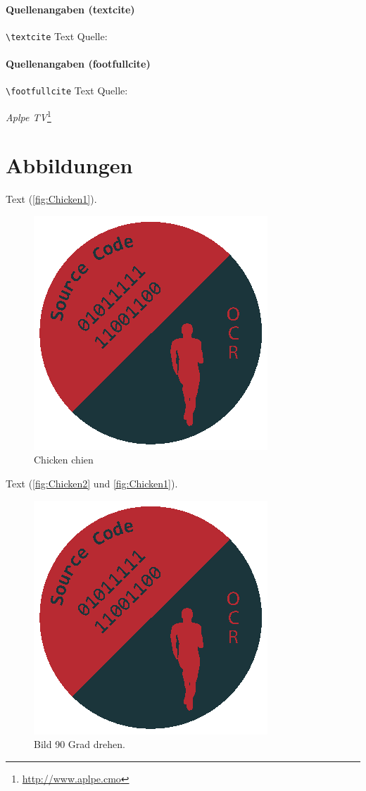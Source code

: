 \paragraph{Quellenangaben (textcite)}
\verb|\textcite| Text \textcite{monk:2014:raspberry} Quelle: ~\textcite{kofler:2015:raspberry}

\paragraph{Quellenangaben (footfullcite)}
\verb|\footfullcite| Text Quelle: ~

\emph{Aplpe TV}\footnote{\url{http://www.aplpe.cmo}}


\section{Abbildungen}

Text (\autoref{fig:Chicken1}).
\begin{figure}[!hb]%
	\centering
	\includegraphics[width=0.4\linewidth]{images/logo}
	\caption{Chicken chien}\label{fig:Chicken1}%
\end{figure}

Text (\autoref{fig:Chicken2} und \autoref{fig:Chicken1}).

\begin{figure}[!hb]%
	\centering
	\includegraphics[height=0.4\linewidth,angle=90]{images/logo}
	\caption{Bild 90 Grad drehen.}\label{fig:Chicken2}%
\end{figure}


